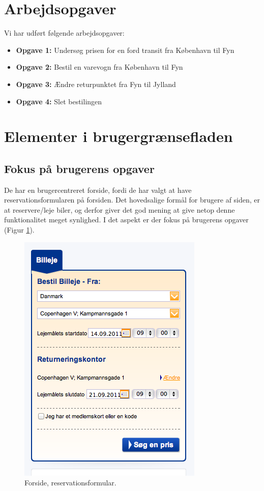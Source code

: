 \documentclass[a4paper]{article}
\begin{document}
\section{Arbejdsopgaver}
Vi har udført følgende arbejdsopgaver:
\begin{itemize}
\item{\textbf{Opgave 1:}}
    Undersøg prisen for en ford transit fra København til Fyn
\item{\textbf{Opgave 2:}}
    Bestil en varevogn fra København til Fyn
\item{\textbf{Opgave 3:}}
    Ændre returpunktet fra Fyn til Jylland
\item{\textbf{Opgave 4:}}
    Slet bestilingen
\end{itemize}

\section{Elementer i brugergrænsefladen}
\subsection{Fokus på brugerens opgaver}
De har en brugercentreret forside, fordi de har valgt at have
reservationsformularen på forsiden. Det hovedsalige formål for brugere af siden,
er at reservere/leje biler, og derfor giver det god mening at give netop denne
funktionalitet meget synlighed. I det aspekt er der fokus på brugerens opgaver
(Figur \ref{forside}).

\begin{figure}[htbp]
  \begin{center}
    \includegraphics[scale=.6]{1.png}
  \end{center}
  \caption{Forside, reservationsformular.}
  \label{forside}
\end{figure}
\end{document}
